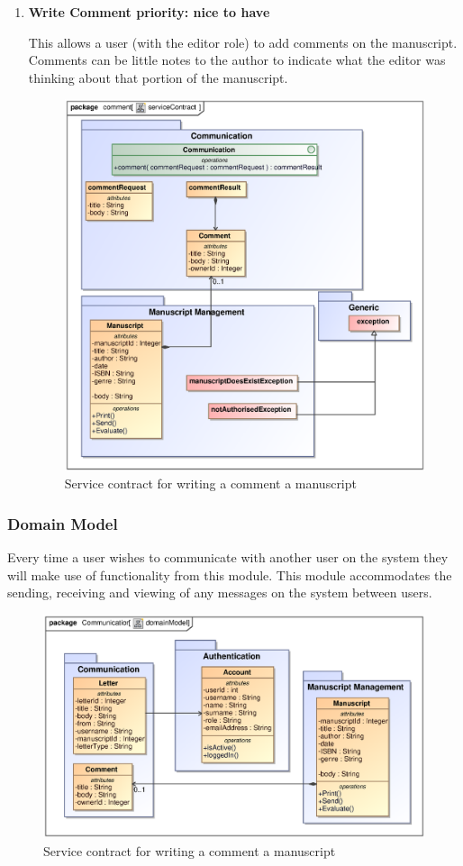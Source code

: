 \begin{enumerate}
\newpage

\item \textbf{Write Comment priority: nice to have}\\
\par{This allows a user (with the editor role) to add comments on the manuscript. Comments can be little notes to the author to indicate what the editor was thinking about that portion of the manuscript.}

\begin{figure}[h]
\includegraphics[scale=0.8]{epsImages/Communication/comment.eps}
\caption{Service contract for writing a comment a manuscript}
\end{figure}
\newpage
\end{enumerate}

\subsubsection{Domain Model}
\par{Every time a user wishes to communicate with another user on the system they will make use of functionality from this module. This module accommodates the sending, receiving and viewing of any messages on the system between users.}

\begin{figure}[h]
\includegraphics[scale=0.8]{epsImages/DomainModels/communicationDomainModel.eps}
\caption{Service contract for writing a comment a manuscript}


\end{figure}
